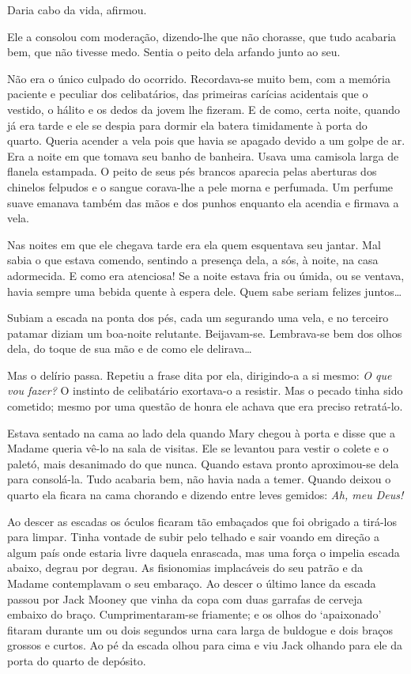 Daria cabo da vida, afirmou.

Ele a consolou com moderação, dizendo-lhe que não chorasse, que tudo
acabaria bem, que não tivesse medo. Sentia o peito dela arfando junto
ao seu.

Não era o único culpado do ocorrido. Recordava-se muito bem, com a
memória paciente e peculiar dos celibatários, das primeiras carícias
acidentais que o vestido, o hálito e os dedos da jovem lhe fizeram. E
de como, certa noite, quando já era tarde e ele se despia para dormir
ela batera timidamente à porta do quarto. Queria acender a vela pois
que havia se apagado devido a um golpe de ar. Era a noite em que
tomava seu banho de banheira. Usava uma camisola larga de flanela
estampada. O peito de seus pés brancos aparecia pelas aberturas dos
chinelos felpudos e o sangue corava-lhe a pele morna e perfumada. Um
perfume suave emanava também das mãos e dos punhos enquanto ela
acendia e firmava a vela.

Nas noites em que ele chegava tarde era ela quem esquentava seu
jantar. Mal sabia o que estava comendo, sentindo a presença dela, a
sós, à noite, na casa adormecida. E como era atenciosa! Se a noite
estava fria ou úmida, ou se ventava, havia sempre uma bebida quente à
espera dele. Quem sabe seriam felizes juntos\ldots{}

Subiam a escada na ponta dos pés, cada um segurando uma vela, e no
terceiro patamar diziam um boa-noite relutante. Beijavam-se.
Lembrava-se bem dos olhos dela, do toque de sua mão e de como ele
delirava\ldots{}

Mas o delírio passa. Repetiu a frase dita por ela, dirigindo-a a si
mesmo: \textit{O que vou fazer?} O instinto de celibatário exortava-o a
resistir. Mas o pecado tinha sido cometido; mesmo por uma questão de
honra ele achava que era preciso retratá-lo.

Estava sentado na cama ao lado dela quando Mary chegou à porta e disse
que a Madame queria vê-lo na sala de visitas. Ele se levantou para
vestir o colete e o paletó, mais desanimado do que nunca. Quando
estava pronto aproximou-se dela para consolá-la. Tudo acabaria bem,
não havia nada a temer. Quando deixou o quarto ela ficara na cama
chorando e dizendo entre leves gemidos: \textit{Ah, meu Deus!}

Ao descer as escadas os óculos ficaram tão embaçados que foi obrigado
a tirá-los para limpar. Tinha vontade de subir pelo telhado e sair
voando em direção a algum país onde estaria livre daquela enrascada,
mas uma força o impelia escada abaixo, degrau por degrau. As
fisionomias implacáveis do seu patrão e da Madame contemplavam o seu
embaraço. Ao descer o último lance da escada passou por Jack Mooney
que vinha da copa com duas garrafas de cerveja embaixo do braço.
Cumprimentaram-se friamente; e os olhos do `apaixonado' fitaram
durante um ou dois segundos urna cara larga de buldogue e dois braços
grossos e curtos. Ao pé da escada olhou para cima e viu Jack olhando
para ele da porta do quarto de depósito.

